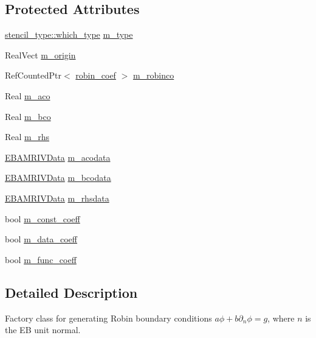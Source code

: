 \subsection*{Protected Attributes}
\begin{DoxyCompactItemize}
\item 
\hyperlink{namespacestencil__type_a1ffed19935b7289b50e8dcc017ee99c8}{stencil\+\_\+type\+::which\+\_\+type} \hyperlink{classrobinconductivityebbcfactory_abaf68b0f5590d6a643df52fd6518fb91}{m\+\_\+type}
\item 
Real\+Vect \hyperlink{classrobinconductivityebbcfactory_a27b41e2e6403d51fcecd5164cf116b51}{m\+\_\+origin}
\item 
Ref\+Counted\+Ptr$<$ \hyperlink{classrobin__coef}{robin\+\_\+coef} $>$ \hyperlink{classrobinconductivityebbcfactory_a7b45b109f2deedfeeb5c56b0d71a4241}{m\+\_\+robinco}
\item 
Real \hyperlink{classrobinconductivityebbcfactory_aaccd7f7c96f393e7835a4b816d6503b3}{m\+\_\+aco}
\item 
Real \hyperlink{classrobinconductivityebbcfactory_acd5793e2a3d30e094a16ea223ac11340}{m\+\_\+bco}
\item 
Real \hyperlink{classrobinconductivityebbcfactory_a809f7d59a8ae38ed5ce8f3d0608180e5}{m\+\_\+rhs}
\item 
\hyperlink{type__definitions_8H_a6b8fa905d55cbb491b52180386f0e0c1}{E\+B\+A\+M\+R\+I\+V\+Data} \hyperlink{classrobinconductivityebbcfactory_a8f8bf4f650071f7ee009d08574dcc107}{m\+\_\+acodata}
\item 
\hyperlink{type__definitions_8H_a6b8fa905d55cbb491b52180386f0e0c1}{E\+B\+A\+M\+R\+I\+V\+Data} \hyperlink{classrobinconductivityebbcfactory_a99480bfa78988fc3e45649bfb648872f}{m\+\_\+bcodata}
\item 
\hyperlink{type__definitions_8H_a6b8fa905d55cbb491b52180386f0e0c1}{E\+B\+A\+M\+R\+I\+V\+Data} \hyperlink{classrobinconductivityebbcfactory_ad7c849e5bb478b3cf0e80ac542354fda}{m\+\_\+rhsdata}
\item 
bool \hyperlink{classrobinconductivityebbcfactory_a4f8bf8e60ffae2d9a86da0de037c6a2c}{m\+\_\+const\+\_\+coeff}
\item 
bool \hyperlink{classrobinconductivityebbcfactory_ad83f951b9867ad280be2dd2fc2e834a3}{m\+\_\+data\+\_\+coeff}
\item 
bool \hyperlink{classrobinconductivityebbcfactory_a98069b7633cc317b2dcd1a7dfebd344e}{m\+\_\+func\+\_\+coeff}
\end{DoxyCompactItemize}


\subsection{Detailed Description}
Factory class for generating Robin boundary conditions $a\phi + b\partial_n\phi = g$, where $n$ is the EB unit normal. 

